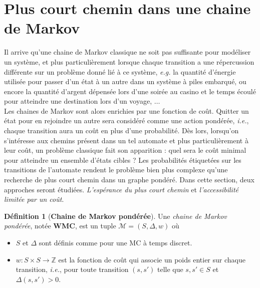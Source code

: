 \documentclass[12pt,a4paper]{report}
\theoremstyle{definition}%
\newtheorem{definition}{Définition}[chapter]
\theoremstyle{remark}
\newcommand{\eg}{\textit{e.g.} }
\newcommand{\ie}{\textit{i.e.}, }
\let\labelitemi\labelitemii
\begin{document}
\section{Plus court chemin dans une chaine de Markov}
Il arrive qu'une chaine de Markov classique ne soit pas suffisante pour modéliser un système, et plus particulièrement lorsque chaque transition a une répercussion différente sur un problème donné lié à ce système, \eg la quantité d'énergie utilisée pour passer d'un état à un autre dans un système à piles embarqué, ou encore la quantité d'argent dépensée lors d'une soirée au casino et le temps écoulé pour atteindre une destination lors d'un voyage, $\dots$ \\
Les chaines de Markov sont alors enrichies par une fonction de coût. Quitter un état pour en rejoindre un autre sera considéré comme une action pondérée, \ie chaque transition aura un coût en plus d'une probabilité. Dès lors, lorsqu'on s'intéresse aux chemins présent dans un tel automate et plus particulièrement à leur coût, un problème classique fait son apparition : quel sera le coût minimal pour atteindre un ensemble d'états cibles ? Les probabilités étiquetées sur les transitions de l'automate rendent le problème bien plus complexe qu'une recherche de plus court chemin dans un graphe pondéré. Dans cette section, deux approches seront étudiées. \textit{L'espérance du plus court chemin} et \textit{l'accessibilité limitée par un coût}.

\begin{definition}[\textbf{Chaine de Markov pondérée}]
	Une \textit{chaine de Markov pondérée}, notée \textbf{WMC}, est un tuple $\mathcal{M} = (S, \Delta, w)$ où
	\begin{itemize}
		\renewcommand{\labelitemi}{\tiny$\bullet$}
		\item $S$ et $\Delta$ sont définis comme pour une MC à temps discret.
		\item $w: S\times S \rightarrow \mathbb{Z}$ est la fonction de coût qui associe un poids entier sur chaque  transition, \ie pour toute transition $(s, s')$ telle que $s, s' \in S$ et $\Delta(s, s') > 0$.
	\end{itemize}
\end{definition}
\end{document}
